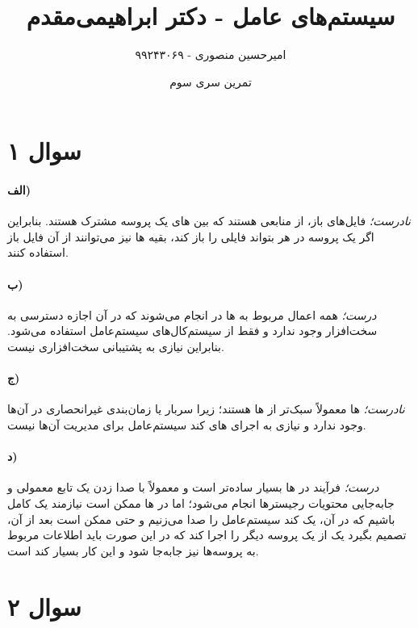 \documentclass{article}
\title{سیستم‌های عامل - دکتر ابراهیمی‌مقدم}
\author{امیرحسین منصوری - ۹۹۲۴۳۰۶۹}
\date{تمرین سری سوم}
\begin{document}
	\maketitle

	\section*{سوال ۱}
	\paragraph*{الف)}
	\textit{نادرست؛}
	فایل‌های باز، از منابعی هستند که بین
	های
	یک پروسه مشترک هستند. بنابراین اگر یک پروسه در هر
	بتواند فایلی را باز کند، بقیه
	ها
	نیز می‌توانند از آن فایل باز استفاده کنند.

	\paragraph*{ب)}
	\textit{درست؛}
	همه اعمال مربوط به
	ها
	در
	انجام می‌شوند که در آن اجازه دسترسی به سخت‌افزار وجود ندارد و فقط از سیستم‌کال‌های سیستم‌عامل استفاده می‌شود. بنابراین نیازی به پشتیبانی سخت‌افزاری نیست.

	\paragraph*{ج)}
	\textit{نادرست؛}
	ها
	معمولاً سبک‌تر از
	ها
	هستند؛ زیرا سربار
	یا زمان‌بندی غیرانحصاری در آن‌ها وجود ندارد و نیازی به اجرای
	های
	کند سیستم‌عامل برای مدیریت آن‌ها نیست.

	\paragraph*{د)}
	\textit{درست؛}
	فرآیند
	در
	ها
	بسیار ساده‌تر است و معمولاً با صدا زدن یک تابع معمولی
	و جابه‌جایی محتویات رجیسترها انجام می‌شود؛ اما در
	ها
	ممکن است نیازمند یک
	کامل باشیم که در آن، یک
	کند سیستم‌عامل را صدا می‌زنیم و حتی ممکن است بعد از آن،
	تصمیم بگیرد یک
	از یک پروسه دیگر را اجرا کند که در این صورت باید اطلاعات مربوط به پروسه‌ها نیز جابه‌جا شود و این کار بسیار کند است.

	\section*{سوال ۲}
\end{document}
